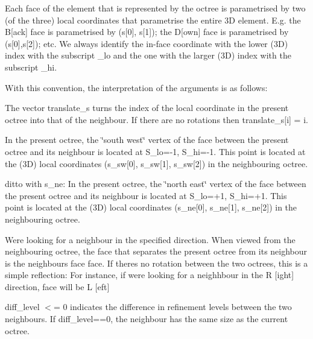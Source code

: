\begin{DoxyItemize}
\item Each face of the element that is represented by the octree is parametrised by two (of the three) local coordinates that parametrise the entire 3D element. E.\+g. the B\mbox{[}ack\mbox{]} face is parametrised by (s\mbox{[}0\mbox{]}, s\mbox{[}1\mbox{]}); the D\mbox{[}own\mbox{]} face is parametrised by (s\mbox{[}0\mbox{]},s\mbox{[}2\mbox{]}); etc. We always identify the in-\/face coordinate with the lower (3D) index with the subscript \+\_\+lo and the one with the larger (3D) index with the subscript \+\_\+hi.
\end{DoxyItemize}With this convention, the interpretation of the arguments is as follows\+:
\begin{DoxyItemize}
\item The vector {\ttfamily translate\+\_\+s} turns the index of the local coordinate in the present octree into that of the neighbour. If there are no rotations then {\ttfamily translate\+\_\+s}\mbox{[}i\mbox{]} = i.
\item In the present octree, the \char`\"{}south west\char`\"{} vertex of the face between the present octree and its neighbour is located at S\+\_\+lo=-\/1, S\+\_\+hi=-\/1. This point is located at the (3D) local coordinates ({\ttfamily s\+\_\+sw}\mbox{[}0\mbox{]}, {\ttfamily s\+\_\+sw}\mbox{[}1\mbox{]}, {\ttfamily s\+\_\+sw}\mbox{[}2\mbox{]}) in the neighbouring octree.
\item ditto with s\+\_\+ne\+: In the present octree, the \char`\"{}north east\char`\"{} vertex of the face between the present octree and its neighbour is located at S\+\_\+lo=+1, S\+\_\+hi=+1. This point is located at the (3D) local coordinates ({\ttfamily s\+\_\+ne}\mbox{[}0\mbox{]}, {\ttfamily s\+\_\+ne}\mbox{[}1\mbox{]}, {\ttfamily s\+\_\+ne}\mbox{[}2\mbox{]}) in the neighbouring octree.
\item We\textquotesingle{}re looking for a neighbour in the specified {\ttfamily direction}. When viewed from the neighbouring octree, the face that separates the present octree from its neighbour is the neighbour\textquotesingle{}s face {\ttfamily face}. If there\textquotesingle{}s no rotation between the two octrees, this is a simple reflection\+: For instance, if we\textquotesingle{}re looking for a neighhbour in the {\ttfamily R} \mbox{[}ight\mbox{]} {\ttfamily direction}, {\ttfamily face} will be {\ttfamily L} \mbox{[}eft\mbox{]}
\item {\ttfamily diff\+\_\+level} $<$= 0 indicates the difference in refinement levels between the two neighbours. If {\ttfamily diff\+\_\+level==0}, the neighbour has the same size as the current octree.
\end{DoxyItemize}

